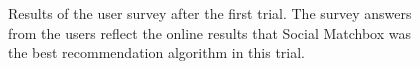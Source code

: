 \begin{figure}[t!]
\hspace{-6mm} 
\hspace{-6mm} 
\caption{Results of the user survey after the first trial. The survey answers from the users reflect the online results that Social Matchbox was the best recommendation algorithm in this trial.}
\label{fig:survey1}
\end{figure}

